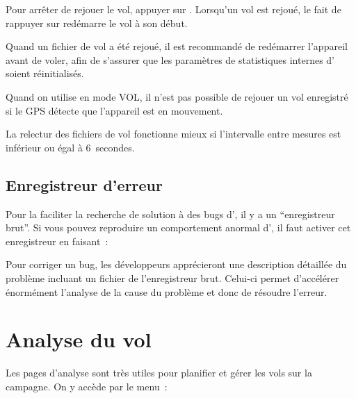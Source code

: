 Pour arrêter de rejouer le vol, appuyer sur .
Lorsqu'un vol est rejoué, le fait de rappuyer sur  redémarre
le vol à son début.

\tip{} Quand un fichier de vol a été rejoué, il est recommandé de redémarrer
l'appareil avant de voler, afin de s'assurer que les paramètres de
statistiques internes d'\xc{} soient réinitialisés.

Quand on utilise \xc{} en mode VOL, il n'est pas possible de rejouer un vol
enregistré si le GPS détecte que l'appareil est en mouvement.

La relectur des fichiers de vol fonctionne mieux si l'intervalle entre mesures est inférieur ou égal à 6~secondes.

\subsection*{Enregistreur d'erreur}\label{sec:raw-logger}
Pour la faciliter la recherche de solution à des bugs d'\xc,
il y a un ``enregistreur brut''. Si vous pouvez reproduire un comportement anormal d'\xc, il faut activer cet enregistreur en faisant~:
\begin{quote}
\blink{}
\end{quote}
Pour corriger un bug, les développeurs apprécieront une description détaillée du problème incluant un fichier de l'enregistreur brut. Celui-ci permet d'accélérer énormément l'analyse de la cause du problème et donc de résoudre l'erreur.

\section{Analyse du vol}\label{sec:analysis-climb}

Les pages d'analyse sont très utiles pour planifier et gérer
les vols sur la campagne. On y accède par le menu~: 
\begin{quote}
\blink{}
\end{quote}

